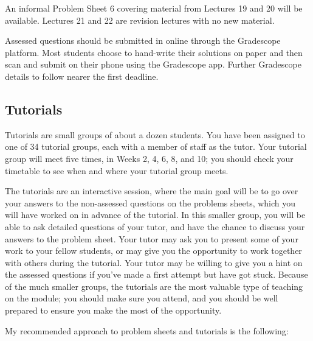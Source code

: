 \documentclass[
  a4paper,
]{book}
\theoremstyle{definition}
\theoremstyle{definition}
\theoremstyle{definition}
\theoremstyle{definition}
\theoremstyle{remark}
\begin{document}
An informal Problem Sheet 6 covering material from Lectures 19 and 20 will be available. Lectures 21 and 22 are revision lectures with no new material.

Assessed questions should be submitted in online through the Gradescope platform. Most students choose to hand-write their solutions on paper and then scan and submit on their phone using the Gradescope app. Further Gradescope details to follow nearer the first deadline.

\hypertarget{tutorials}{%
\subsection*{Tutorials}\label{tutorials}}

Tutorials are small groups of about a dozen students. You have been assigned to one of 34 tutorial groups, each with a member of staff as the tutor. Your tutorial group will meet five times, in Weeks 2, 4, 6, 8, and 10; you should check your timetable to see when and where your tutorial group meets.

The tutorials are an interactive session, where the main goal will be to go over your answers to the non-assessed questions on the problems sheets, which you will have worked on in advance of the tutorial. In this smaller group, you will be able to ask detailed questions of your tutor, and have the chance to discuss your answers to the problem sheet. Your tutor may ask you to present some of your work to your fellow students, or may give you the opportunity to work together with others during the tutorial. Your tutor may be willing to give you a hint on the assessed questions if you've made a first attempt but have got stuck. Because of the much smaller groups, the tutorials are the most valuable type of teaching on the module; you should make sure you attend, and you should be well prepared to ensure you make the most of the opportunity.

My recommended approach to problem sheets and tutorials is the following:
\end{document}
